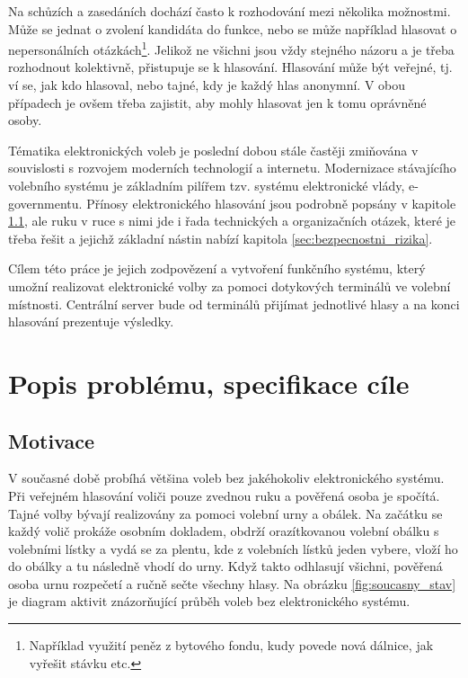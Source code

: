 \documentclass[11pt,twoside,a4paper]{book}
\begin{document}
Na schůzích a zasedáních dochází často k rozhodování mezi několika možnostmi. Může se jednat o zvolení kandidáta do funkce, nebo se může například hlasovat o nepersonálních otázkách\footnote{Například využití peněz z bytového fondu, kudy povede nová dálnice, jak vyřešit stávku etc.}. Jelikož ne všichni jsou vždy stejného názoru a je třeba rozhodnout kolektivně, přistupuje se k hlasování. Hlasování může být veřejné, tj. ví se, jak kdo hlasoval, nebo tajné, kdy je každý hlas anonymní. V obou případech je ovšem třeba zajistit, aby mohly hlasovat jen k tomu oprávněné osoby.

Tématika elektronických voleb je poslední dobou stále častěji zmiňována v souvislosti s rozvojem moderních technologií a internetu. Modernizace stávajícího volebního systému je základním pilířem tzv. systému elektronické vlády, e-governmentu. Přínosy elektronického hlasování jsou podrobně popsány v kapitole \ref{sec:motivace}, ale ruku v ruce s nimi jde i řada technických a organizačních otázek, které je třeba řešit a jejichž základní nástin nabízí kapitola \ref{sec:bezpecnostni_rizika}.

Cílem této práce je jejich zodpovězení a vytvoření funkčního systému, který umožní realizovat elektronické volby za pomoci dotykových terminálů ve volební místnosti. Centrální server bude od terminálů přijímat jednotlivé hlasy a na konci hlasování prezentuje výsledky.


\chapter{Popis problému, specifikace cíle}

\section{Motivace} \label{sec:motivace}

V současné době probíhá většina voleb bez jakéhokoliv elektronického systému. Při veřej\-ném hlasování voliči pouze zvednou ruku a pověřená osoba je spočítá. Tajné volby bývají realizovány za pomoci volební urny a obálek. Na začátku se každý volič prokáže osobním dokladem, obdrží orazítkovanou volební obálku s volebními lístky a vydá se za plentu, kde z volebních lístků jeden vybere, vloží ho do obálky a tu následně vhodí do urny. Když takto odhlasují všichni, pověřená osoba urnu rozpečetí a ručně sečte všechny hlasy. Na obrázku \ref{fig:soucasny_stav} je diagram aktivit znázorňující průběh voleb bez elektronického systému.
\end{document}
